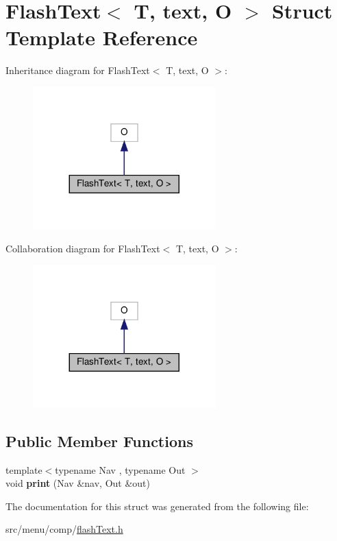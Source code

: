 \hypertarget{structFlashText}{}\section{Flash\+Text$<$ T, text, O $>$ Struct Template Reference}
\label{structFlashText}


Inheritance diagram for Flash\+Text$<$ T, text, O $>$\+:\nopagebreak
\begin{figure}[H]
\begin{center}
\leavevmode
\includegraphics[width=200pt]{structFlashText__inherit__graph}
\end{center}
\end{figure}


Collaboration diagram for Flash\+Text$<$ T, text, O $>$\+:\nopagebreak
\begin{figure}[H]
\begin{center}
\leavevmode
\includegraphics[width=200pt]{structFlashText__coll__graph}
\end{center}
\end{figure}
\subsection*{Public Member Functions}
\begin{DoxyCompactItemize}
\item 
\mbox{\label{structFlashText_a8a409170d4bfc09c251ac5aa5760a4d7}} 
{\footnotesize template$<$typename Nav , typename Out $>$ }\\void {\bfseries print} (Nav \&nav, Out \&out)
\end{DoxyCompactItemize}


The documentation for this struct was generated from the following file\+:\begin{DoxyCompactItemize}
\item 
src/menu/comp/\hyperlink{flashText_8h}{flash\+Text.\+h}\end{DoxyCompactItemize}
